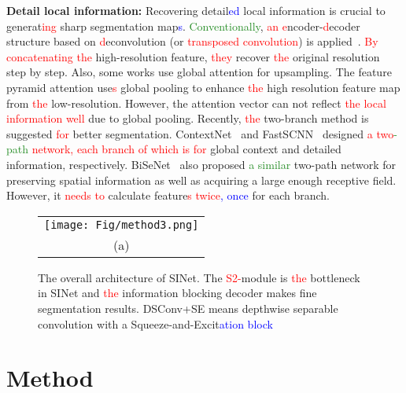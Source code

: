 \documentclass[10pt,twocolumn,letterpaper]{article}
\newcommand\Lars[1]{\textcolor{blue}{#1}}
\newcommand\yj[1]{\textcolor{ForestGreen}{#1}}
\newcommand\nj[1]{\textcolor{red}{#1}}
\newcommand\Lars[1]{#1}
\newcommand\yj[1]{#1}
\newcommand\nj[1]{#1}
\begin{document}
\noindent
\textbf{Detail local information:}
Recovering detail\Lars{ed} local information is crucial to generat\nj{ing} sharp segmentation map\Lars{s}.
\yj{Conventionally}, \nj{an e}ncoder-\nj{d}ecoder structure based on \nj{d}econvolution (or \nj{transposed convolution}) is applied~\cite{long2015fully, noh2015learning}.
\nj{By concatenating the} high-resolution feature, \nj{they} recover \nj{the} original resolution step by step.
Also, some works use global attention for upsampling. 
The feature pyramid attention \cite{li2018pyramid} use\nj{s} global pooling to enhance \nj{the} high resolution feature map from \nj{the} low-resolution.
However, the attention vector can not reflect \nj{the local information well} due to global pooling.
Recently, \nj{the} two-branch method is suggested \nj{for} better segmentation.
ContextNet~\cite{poudel2018contextnet} and FastSCNN~\cite{poudel2019fast} designed \nj{a two\yj{-path} network, each branch of which is for} global context and detailed information, respectively.
BiSeNet~\cite{yu2018bisenet} also proposed \yj{a similar} two-path network for preserving spatial information as well as acquiring a large enough receptive field.
However, it \nj{needs to} calculate feature\nj{s} \nj{twice}\Lars{, once} for each branch.



 
\begin{figure*}[t]
\begin{center}
\begin{tabular}{c}
    \texttt{[image: Fig/method3.png]} \\ 
    (a)  \\
        \end{tabular}\end{center}
   \caption{The overall architecture of SINet. The \nj{S2-}module is \nj{the} bottleneck in SINet and \nj{the} information blocking decoder makes fine segmentation results. DSConv+SE means depthwise separable convolution with a Squeeze-and-Excit\Lars{ation block}}
\label{fig:arch}
\end{figure*}

\section{Method}
\label{sec:method}
\end{document}

